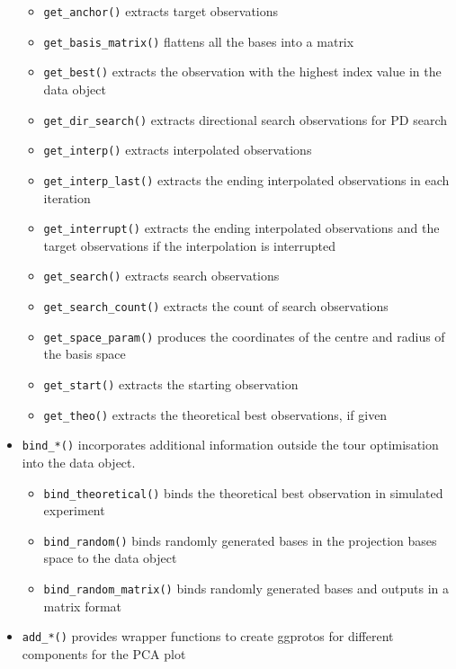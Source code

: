 \begin{itemize}
  \begin{itemize}
  \tightlist
  \item
    \texttt{get\_anchor()} extracts target observations
  \item
    \texttt{get\_basis\_matrix()} flattens all the bases into a matrix
  \item
    \texttt{get\_best()} extracts the observation with the highest index
    value in the data object
  \item
    \texttt{get\_dir\_search()} extracts directional search observations
    for PD search
  \item
    \texttt{get\_interp()} extracts interpolated observations
  \item
    \texttt{get\_interp\_last()} extracts the ending interpolated
    observations in each iteration
  \item
    \texttt{get\_interrupt()} extracts the ending interpolated
    observations and the target observations if the interpolation is
    interrupted
  \item
    \texttt{get\_search()} extracts search observations
  \item
    \texttt{get\_search\_count()} extracts the count of search
    observations
  \item
    \texttt{get\_space\_param()} produces the coordinates of the centre
    and radius of the basis space
  \item
    \texttt{get\_start()} extracts the starting observation
  \item
    \texttt{get\_theo()} extracts the theoretical best observations, if
    given
  \end{itemize}
\item
  \texttt{bind\_*()} incorporates additional information outside the
  tour optimisation into the data object.

  \begin{itemize}
  \tightlist
  \item
    \texttt{bind\_theoretical()} binds the theoretical best observation
    in simulated experiment
  \item
    \texttt{bind\_random()} binds randomly generated bases in the
    projection bases space to the data object
  \item
    \texttt{bind\_random\_matrix()} binds randomly generated bases and
    outputs in a matrix format
  \end{itemize}
\item
  \texttt{add\_*()} provides wrapper functions to create ggprotos for
  different components for the PCA plot


\end{itemize}
